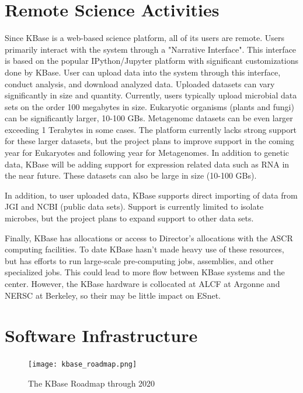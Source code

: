 \documentclass[10pt,a4paper]{report}
\begin{document}
\section{Remote Science Activities}
\label{sec:kbase-rsa}

Since KBase is a web-based science platform, all of its users are remote.  Users primarily interact with the system through a "Narrative Interface".  This interface is based on the popular IPython/Jupyter platform with significant customizations done by KBase.  User can upload  data into the system through this interface, conduct analysis, and download analyzed data.  Uploaded datasets can vary significantly in size and quantity.  Currently, users typically upload microbial data sets on the order 100 megabytes in size.  Eukaryotic organisms (plants and fungi) can be significantly larger, 10-100 GBs.  Metagenomc datasets can be even larger exceeding 1 Terabytes in some cases.  The platform currently lacks strong support for these larger datasets, but the project plans to improve support in the coming year for Eukaryotes and following year for Metagenomes.  In addition to genetic data, KBase will be adding support for expression related data such as RNA in the near future.  These datasets can also be large in size (10-100 GBs).

In addition, to user uploaded data, KBase supports direct importing of data from JGI and NCBI (public data sets).  Support is currently limited to isolate microbes, but the project plans to expand support to other data sets.

Finally, KBase has allocations or access to Director's allocations with the ASCR computing facilities.  To date  KBase hasn't made heavy use of these resources, but has efforts to run large-scale pre-computing jobs, assemblies, and other specialized jobs.  This could lead to more flow between KBase systems and the center.  However, the KBase hardware is collocated at ALCF at Argonne and NERSC at Berkeley, so their may be little impact on ESnet.

\section{Software Infrastructure}
\begin{figure}[htbp]
\begin{center}
\texttt{[image: kbase\_roadmap.png]}  
\caption{The KBase Roadmap through 2020}
\label{kbase:roadmap} 
\end{center}
\end{figure}
\end{document}
